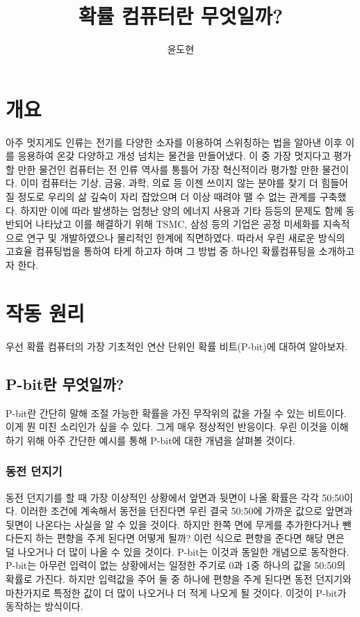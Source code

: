 \documentclass{article}
\title{확률 컴퓨터란 무엇일까?}
\author{윤도현}
\begin{document}
	\maketitle
	\section{개요}
	아주 멋지게도 인류는 전기를 다양한 소자를 이용하여 스위칭하는 법을 알아낸 이후 이를 응용하여 온갖 다양하고 개성 넘치는 물건을 만들어냈다. 이 중 가장 멋지다고 평가할 만한 물건인 컴퓨터는 전 인류 역사를 통틀어 가장 혁신적이라 평가할 만한 물건이다. 이미 컴퓨터는 기상, 금융, 과학, 의료 등 이젠 쓰이지 않는 분야를 찾기 더 힘들어질 정도로 우리의 삶 깊숙이 자리 잡았으며 더 이상 때려야 땔 수 없는 관계를 구축했다. 하지만 이에 따라 발생하는 엄청난 양의 에너지 사용과 기타 등등의 문제도 함께 동반되어 나타났고 이를 해결하기 위해 TSMC, 삼성 등의 기업은 공정 미세화를 지속적으로 연구 및 개발하였으나 물리적인 한계에 직면하였다. 따라서 우린 새로운 방식의 고효율 컴퓨팅법을 통하여 타게 하고자 하며 그 방법 중 하나인 확률컴퓨팅을 소개하고자 한다.
	\section{작동 원리}
	우선 확률 컴퓨터의 가장 기초적인 연산 단위인 확률 비트(P-bit)에 대하여 알아보자. 
	\subsection{P-bit란 무엇일까?}
	P-bit란 간단히 말해 조절 가능한 확률을 가진 무작위의 값을 가질 수 있는 비트이다. 이게 뭔 미친 소리인가 싶을 수 있다. 그게 매우 정상적인 반응이다. 우린 이것을 이해하기 위해 아주 간단한 예시를 통해 P-bit에 대한 개념을 살펴볼 것이다.
	\subsubsection{동전 던지기}
	동전 던지기를 할 때 가장 이상적인 상황에서 앞면과 뒷면이 나올 확률은 각각 50:50이다. 이러한 조건에 계속해서 동전을 던진다면 우린 결국 50:50에 가까운 값으로 앞면과 뒷면이 나온다는 사실을 알 수 있을 것이다. 하지만 한쪽 면에 무게를 추가한다거나 뺀다든지 하는 편향을 주게 된다면 어떻게 될까? 이런 식으로 편향을 준다면 해당 면은 덜 나오거나 더 많이 나올 수 있을 것이다. P-bit는 이것과 동일한 개념으로 동작한다. P-bit는 아무런 입력이 없는 상황에서는 일정한 주기로 0과 1중 하나의 값을 50:50의 확률로 가진다. 하지만 입력값을 주어 둘 중 하나에 편향을 주게 된다면 동전 던지기와 마찬가지로 특정한 값이 더 많이 나오거나 더 적게 나오게 될 것이다. 이것이 P-bit가 동작하는 방식이다.
\end{document}
